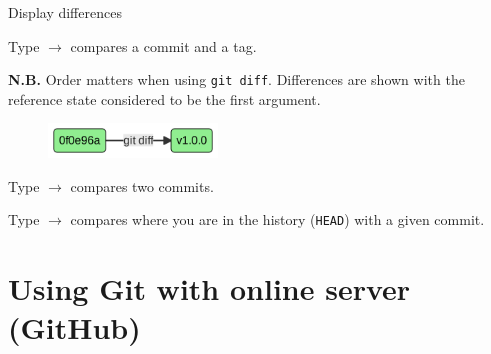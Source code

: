 \documentclass[10pt]{beamer}
\begin{document}
\begin{frame}[fragile]{Display differences}
\protect\hypertarget{display-differences}{}

Type  \(\rightarrow\) compares a
commit and a tag.

\textbf{N.B.} Order matters when using \texttt{git\ diff}. Differences are shown with
the reference state considered to be the first argument.

\begin{figure}[H]

{\centering \includegraphics[width=0.4\textwidth]{mermaid/mermaid-figure-16.png}

}

\end{figure}

Type  \(\rightarrow\) compares two
commits.

Type  \(\rightarrow\) compares where
you are in the history (\texttt{HEAD}) with a given commit.
\end{frame}

\section{Using Git with online server (GitHub)}
\end{document}
